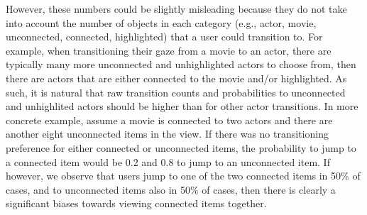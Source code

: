 However, these numbers could be slightly misleading because they do not take into account the number of objects in each category (e.g., actor, movie, unconnected, connected, highlighted) that a  user could transition to. For example, when transitioning their gaze from a movie to an actor, there are typically many more unconnected and unhighlighted actors to choose from, then there are actors that are either connected to the movie and/or highlighted. As such, it is natural that raw transition counts and probabilities to unconnected and unhighlited  actors should be higher than for other actor transitions. In more concrete example, assume a movie is connected to two actors and there are another eight unconnected items in the view. If there was no transitioning preference for either connected or unconnected items, the probability to jump to a connected item would be 0.2 and 0.8 to jump to an unconnected item. If however, we observe that users jump to one of the two connected items in 50\% of cases, and to unconnected items also in 50\% of cases, then there is clearly a significant biases towards viewing connected items together.



